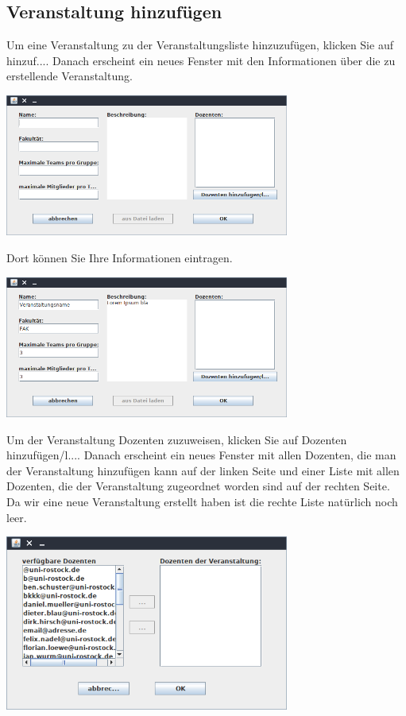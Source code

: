 \documentclass{Handbuch}
\begin{document}
\subsection{Veranstaltung hinzufügen}
Um eine Veranstaltung zu der Veranstaltungsliste hinzuzufügen, klicken Sie auf \frqq hinzuf...\flqq{}.
Danach erscheint ein neues Fenster mit den Informationen über die zu erstellende Veranstaltung.
\begin{center}
	\includegraphics[width=0.7\textwidth]{img_adminGUI_02.png}
\end{center}
Dort können Sie Ihre Informationen eintragen.
\begin{center}
	\includegraphics[width=0.7\textwidth]{img_adminGUI_03.png}
\end{center}
Um der Veranstaltung Dozenten zuzuweisen, klicken Sie auf \frqq Dozenten hinzufügen/l...\flqq{}.
Danach erscheint ein neues Fenster mit allen Dozenten, die man der Veranstaltung hinzufügen kann auf der linken Seite und einer Liste mit allen Dozenten, die der Veranstaltung zugeordnet worden sind auf der rechten Seite. Da wir eine neue Veranstaltung erstellt haben ist die rechte Liste natürlich noch leer.
\begin{center}
	\includegraphics[width=0.7\textwidth]{img_adminGUI_04.png}
\end{center}
\end{document}
